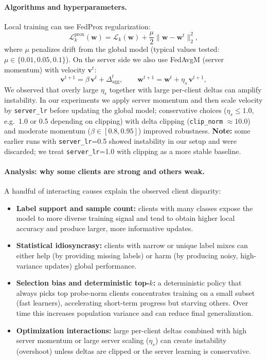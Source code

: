 \documentclass[10pt,twocolumn,letterpaper]{article}
\begin{document}
\paragraph{Algorithms and hyperparameters.}
Local training can use FedProx regularization:
\[
\mathcal{L}_k^{\text{prox}}(\mathbf{w}) = \mathcal{L}_k(\mathbf{w}) + \frac{\mu}{2}\|\mathbf{w}-\mathbf{w}^t\|_2^2,
\]
where $\mu$ penalizes drift from the global model (typical values tested: $\mu\in\{0.01,0.05,0.1\}$). On the server side we also use FedAvgM (server momentum) with velocity $\mathbf{v}^t$:
\[
\mathbf{v}^{t+1} = \beta\,\mathbf{v}^t + \Delta_{\mathrm{agg}}^t,\qquad
\mathbf{w}^{t+1} = \mathbf{w}^t + \eta_s\,\mathbf{v}^{t+1},
\]
We observed that overly large $\eta_s$ together with large per-client deltas can amplify instability. 
In our experiments we apply server momentum and then scale velocity by \texttt{server\_lr} before updating the global model; 
conservative choices ($\eta_s \leq 1.0$, e.g.\ 1.0 or 0.5 depending on clipping) with delta clipping 
(\texttt{clip\_norm} $\approx 10.0$) and moderate momentum ($\beta \in [0.8,0.95]$) improved robustness. 
\textbf{Note:} some earlier runs with \texttt{server\_lr}=0.5 showed instability in our setup and were discarded; 
we treat \texttt{server\_lr}=1.0 with clipping as a more stable baseline.




\paragraph{Analysis: why some clients are strong and others weak.}
A handful of interacting causes explain the observed client disparity:
\begin{itemize}
  \item \textbf{Label support and sample count:} clients with many classes expose the model to more diverse training signal and tend to obtain higher local accuracy and produce larger, more informative updates.
  \item \textbf{Statistical idiosyncrasy:} clients with narrow or unique label mixes can either help (by providing missing labels) or harm (by producing noisy, high-variance updates) global performance.
  \item \textbf {Selection bias and deterministic top-$k$:} a deterministic policy that always picks top probe-norm clients concentrates training on a small subset (fast learners), accelerating short-term progress but starving others. Over time this increases population variance and can reduce final generalization.
  \item \textbf{Optimization interactions:} large per-client deltas combined with high server momentum or large server scaling ($\eta_s$) can create instability (overshoot) unless deltas are clipped or the server learning is conservative.
\end{itemize}
\end{document}

